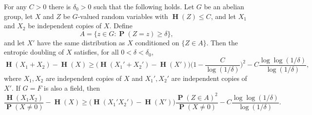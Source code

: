\documentclass[twoside, 10pt]{article}
\DeclareMathOperator{\Eta}{\mathbf{H}}
\DeclareMathOperator{\pr}{\mathbf{P}}
\begin{document}
\begin{lemma}\label{lemZsupport}
For any $C>0$ there is $\delta_0 > 0$ such that the following holds.
Let $G$ be an abelian group, let
$X$ and $Z$ be $G$-valued random variables with $\Eta(Z) \leq C$, and let
$X_1$ and $X_2$ be independent copies of $X$. Define
$$A = \bigl\{z\in G : \pr(Z=z)\ge \delta\bigr\},$$
and let $X'$ have the same distribution as $X$ conditioned
on $\{Z\in A\}$.
Then the entropic doubling of $X$ satisfies,
for all $0<\delta<\delta_0$,
\begin{equation}
\Eta(X_1 + X_2) - \Eta(X)
\ge \bigl(\Eta(X_1' + X_2') - \Eta(X')\bigr)
\biggl(1-\frac{C}{\log(1/\delta)}\biggr)^2 
- C\frac{\log\log(1/\delta)}{\log(1/\delta)},
\label{eq:firstclaim}
\end{equation}
where $X_1,X_2$ are independent copies of $X$
and $X_1',X_2'$ are independent copies of $X'$.
If $G=F$ is also a field, then 
$$\frac{\Eta(X_1 X_2)}{\pr(X\ne 0)} - \Eta(X)
\ge \bigl(\Eta(X_1' X_2') - \Eta(X')\bigr)
\frac{\pr(Z\in A)^2}{\pr(X\ne 0)} 
- C\frac{\log\log(1/\delta)}{\log(1/\delta)}.$$
\end{lemma}
\end{document}
